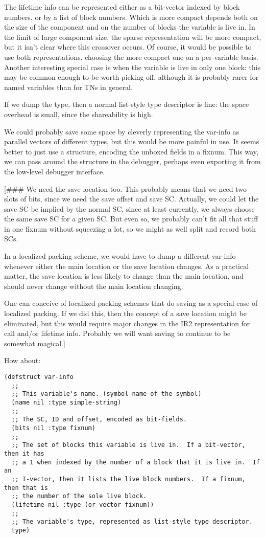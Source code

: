 The lifetime info can be represented either as a bit-vector indexed by block
numbers, or by a list of block numbers.  Which is more compact depends both on
the size of the component and on the number of blocks the variable is live in.
In the limit of large component size, the sparse representation will be more
compact, but it isn't clear where this crossover occurs.  Of course, it would
be possible to use both representations, choosing the more compact one on a
per-variable basis.  Another interesting special case is when the variable is
live in only one block: this may be common enough to be worth picking off,
although it is probably rarer for named variables than for TNs in general.

If we dump the type, then a normal list-style type descriptor is fine: the
space overhead is small, since the shareability is high.

We could probably save some space by cleverly representing the var-info as
parallel vectors of different types, but this would be more painful in use.
It seems better to just use a structure, encoding the unboxed fields in a
fixnum.  This way, we can pass around the structure in the debugger, perhaps
even exporting it from the low-level debugger interface.

[\#\#\# We need the save location too.  This probably means that we need two slots
of bits, since we need the save offset and save SC.  Actually, we could let the
save SC be implied by the normal SC, since at least currently, we always choose
the same save SC for a given SC.  But even so, we probably can't fit all that
stuff in one fixnum without squeezing a lot, so we might as well split and
record both SCs.

In a localized packing scheme, we would have to dump a different var-info
whenever either the main location or the save location changes.  As a practical
matter, the save location is less likely to change than the main location, and
should never change without the main location changing.

One can conceive of localized packing schemes that do saving as a special case
of localized packing.  If we did this, then the concept of a save location
might be eliminated, but this would require major changes in the IR2
representation for call and/or lifetime info.  Probably we will want saving to
continue to be somewhat magical.]


How about:

\begin{verbatim}
(defstruct var-info
  ;;
  ;; This variable's name. (symbol-name of the symbol)
  (name nil :type simple-string)
  ;;
  ;; The SC, ID and offset, encoded as bit-fields.
  (bits nil :type fixnum)
  ;;
  ;; The set of blocks this variable is live in.  If a bit-vector, then it has
  ;; a 1 when indexed by the number of a block that it is live in.  If an
  ;; I-vector, then it lists the live block numbers.  If a fixnum, then that is
  ;; the number of the sole live block.
  (lifetime nil :type (or vector fixnum))
  ;;
  ;; The variable's type, represented as list-style type descriptor.
  type)
\end{verbatim}

